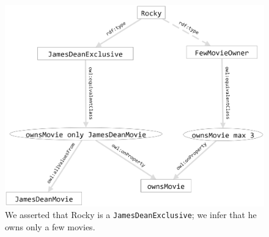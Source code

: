 \begin{figure}
\centering
\includegraphics[width=5in]{SWWOv3/media/ch13/figure13-3.png}
\caption{We asserted that Rocky is a \texttt{JamesDeanExclusive}; we infer that he owns
only a few movies.
}
\label{fig:ch13.03}
\end{figure}




